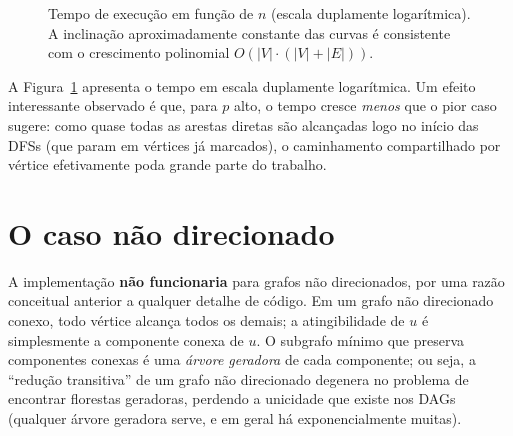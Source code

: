 \documentclass[10pt,twocolumn]{article}
\begin{document}
\begin{figure}[t]
\centering
{}
\caption{Tempo de execução em função de $n$ (escala duplamente logarítmica). A inclinação aproximadamente constante das curvas é consistente com o crescimento polinomial $O(|V|\cdot(|V|+|E|))$.}
\label{fig:tempo}
\end{figure}

A Figura~\ref{fig:tempo} apresenta o tempo em escala duplamente logarítmica. Um efeito interessante observado é que, para $p$ alto, o tempo cresce \emph{menos} que o pior caso sugere: como quase todas as arestas diretas são alcançadas logo no início das DFSs (que param em vértices já marcados), o caminhamento compartilhado por vértice efetivamente poda grande parte do trabalho.

\section{O caso não direcionado}
\label{sec:nao-dir}

A implementação \textbf{não funcionaria} para grafos não direcionados, por uma razão conceitual anterior a qualquer detalhe de código. Em um grafo não direcionado conexo, todo vértice alcança todos os demais; a atingibilidade de $u$ é simplesmente a componente conexa de $u$. O subgrafo mínimo que preserva componentes conexas é uma \emph{árvore geradora} de cada componente; ou seja, a ``redução transitiva'' de um grafo não direcionado degenera no problema de encontrar florestas geradoras, perdendo a unicidade que existe nos DAGs (qualquer árvore geradora serve, e em geral há exponencialmente muitas).
\end{document}
